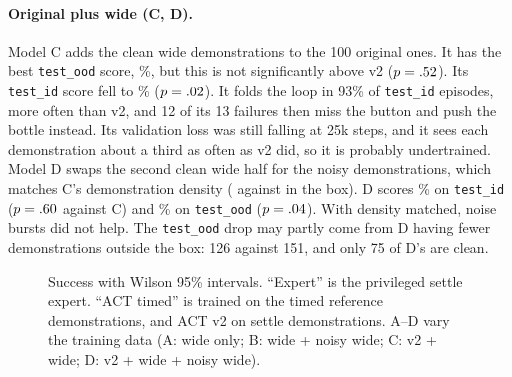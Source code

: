 \documentclass[10pt,twocolumn,letterpaper]{article}
\newcommand{\ttt}[1]{\texttt{\small #1}}
\newcommand{\tts}[1]{\texttt{\scriptsize #1}}
\begin{document}
\paragraph{Original plus wide (C, D).} Model C adds the \ADemos{} clean wide demonstrations to the 100
original ones. It has the best \ttt{test\_ood} score, \COod\%, but this is not significantly above v2 ($p
= .52$). Its \ttt{test\_id} score fell to \CId\% ($p = .02$). It folds the loop in 93\% of \ttt{test\_id}
episodes, more often than v2, and 12 of its 13 failures then miss the button and push the bottle instead. Its
validation loss was still falling at 25k steps, and it sees each demonstration about a third as often as v2
did, so it is probably undertrained. Model D swaps the second clean wide half for the noisy demonstrations,
which matches C's demonstration density (\DInBox{} against \CInBox{} in the box). D scores \DId\% on
\ttt{test\_id} ($p = .60$ against C) and \DOod\% on \ttt{test\_ood} ($p = .04$). With density
matched, noise bursts did not help. The \ttt{test\_ood} drop may partly come from D having fewer
demonstrations outside the box: 126 against 151, and only 75 of D's are clean.

\begin{figure}[t]
\centering
{}
\caption{Success with Wilson 95\% intervals. ``Expert'' is the privileged settle expert. ``ACT timed'' is trained
on the timed reference demonstrations, and ACT v2 on settle demonstrations. A--D vary the training data (A: wide
only; B: wide + noisy wide; C: v2 + wide; D: v2 + wide + noisy wide).}
\label{fig:results}
\end{figure}
\end{document}

